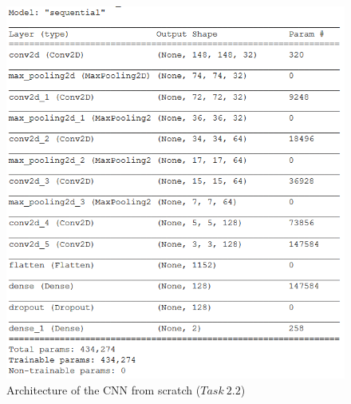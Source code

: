 \documentclass[11pt,a4paper,oneside]{article}
\begin{document}
\begin{figure}[h]
\centering
\includegraphics[width=.5\textwidth]{images/2.2/1_model}
\caption{Architecture of the CNN from scratch ($Task\ 2.2$)}
\label{fig:model_2.2_1}
\end{figure}
\end{document}
